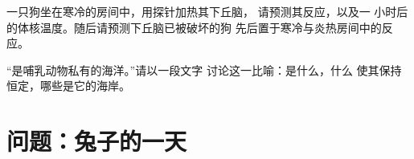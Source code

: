 \begin{exercise}[$\star\star\star$]\label{exo:b1:mammal-organization:11}
一只狗坐在寒冷的房间中，用探针加热其下丘脑，
请预测其反应，以及一
小时后的体核温度。随后请预测下丘脑已被破坏的狗
先后置于寒冷与炎热房间中的反应。
\end{exercise}

\begin{exercise}[$\star\star\star$]\label{exo:b1:mammal-organization:12}
“是哺乳动物私有的海洋。”请以一段文字
讨论这一比喻：是什么，什么
使其保持恒定，哪些是它的海岸。
\end{exercise}

\section{问题：兔子的一天}

